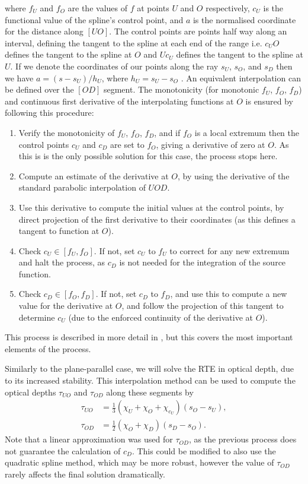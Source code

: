 where $f_U$ and $f_O$ are the values of $f$ at points $U$ and $O$ respectively, $c_U$ is the functional value of the spline's control point, and $a$ is the normalised coordinate for the distance along $[UO]$.
The control points are points half way along an interval, defining the tangent to the spline at each end of the range i.e. $c_U O$ defines the tangent to the spline at $O$ and $U c_U$ defines the tangent to the spline at $U$.
If we denote the coordinates of our points along the ray $s_U$, $s_O$, and $s_D$ then we have $a = (s - s_U) / h_U$, where $h_U = s_U - s_O$ .
An equivalent interpolation can be defined over the $[OD]$ segment.
The monotonicity (for monotonic $f_U$, $f_O$, $f_D$) and continuous first derivative of the interpolating functions at $O$ is ensured by following this procedure:
\begin{enumerate}
    \item Verify the monotonicity of $f_U$, $f_O$, $f_D$, and if $f_O$ is a local extremum then the control points $c_U$ and $c_D$ are set to $f_O$, giving a derivative of zero at $O$. As this is is the only possible solution for this case, the process stops here.

    \item Compute an estimate of the derivative at $O$, by using the derivative of the standard parabolic interpolation of $UOD$.

    \item Use this derivative to compute the initial values at the control points, by direct projection of the first derivative to their coordinates (as this defines a tangent to function at $O$).

    \item Check $c_U \in [f_U, f_O]$. If not, set $c_U$ to $f_U$ to correct for any new extremum and halt the process, as $c_D$ is not needed for the integration of the source function.

    \item Check $c_D \in [f_O, f_D]$. If not, set $c_D$ to $f_D$, and use this to compute a new value for the derivative at $O$, and follow the projection of this tangent to determine $c_U$ (due to the enforced continuity of the derivative at $O$).
\end{enumerate}
This process is described in more detail in \citet{Stepan2013}, but this covers the most important elements of the process.

Similarly to the plane-parallel case, we will solve the RTE in optical depth, due to its increased stability.
This interpolation method can be used to compute the optical depths $\tau_{UO}$ and $\tau_{OD}$ along these segments by
\begin{align}
    \tau_{UO} &= \frac{1}{3}(\chi_U + \chi_O + \chi_{c_U}) (s_O - s_U),\\
    \tau_{OD} &= \frac{1}{2}(\chi_O + \chi_D) (s_D - s_O).
\end{align}
Note that a linear approximation was used for $\tau_{OD}$, as the previous process does not guarantee the calculation of $c_D$.
This could be modified to also use the quadratic spline method, which may be more robust, however the value of $\tau_{OD}$ rarely affects the final solution dramatically.

